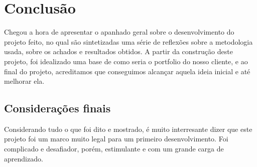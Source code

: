 \chapter{Conclusão}
\label{chap:conc}

Chegou a hora de apresentar o apanhado geral sobre o desenvolvimento do
projeto feito, no qual s\~ao sintetizadas uma s\'erie de
reflex\~oes sobre a metodologia usada, sobre os achados e
resultados obtidos. A partir da construção deste projeto, foi idealizado
uma base de como seria o portfolio do nosso cliente, e ao final do projeto,
acreditamos que conseguimos alcançar aquela ideia inicial e até melhorar ela.


\section{Considerações finais}
\label{sec:consid}

Considerando tudo o que foi dito e mostrado, é muito interresante dizer
que este projeto foi um marco muito legal para um primeiro desenvolvimento. 
Foi complicado e desafiador, porém, estimulante e com um grande carga de 
aprendizado.

